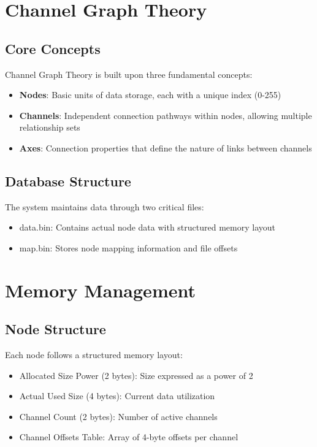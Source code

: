 \section{Channel Graph Theory}\label{Sec:Theory}
\subsection{Core Concepts}
Channel Graph Theory is built upon three fundamental concepts:
\begin{itemize}
    \item \textbf{Nodes}: Basic units of data storage, each with a unique index (0-255)
    \item \textbf{Channels}: Independent connection pathways within nodes, allowing multiple relationship sets
    \item \textbf{Axes}: Connection properties that define the nature of links between channels
\end{itemize}

\subsection{Database Structure}
The system maintains data through two critical files:
\begin{itemize}
    \item data.bin: Contains actual node data with structured memory layout
    \item map.bin: Stores node mapping information and file offsets
\end{itemize}

\section{Memory Management}\label{Sec:Memory}
\subsection{Node Structure}
Each node follows a structured memory layout:
\begin{itemize}
    \item Allocated Size Power (2 bytes): Size expressed as a power of 2
    \item Actual Used Size (4 bytes): Current data utilization
    \item Channel Count (2 bytes): Number of active channels
    \item Channel Offsets Table: Array of 4-byte offsets per channel
\end{itemize}

